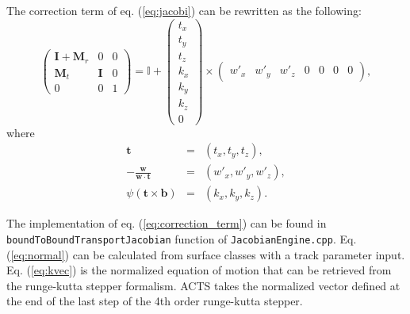 \documentclass[12pt,a4paper]{scrarticle}
\begin{document}
The correction term of eq. (\ref{eq:jacobi}) can be rewritten as the following:
\begin{equation}\label{eq:correction_term}
    \begin{pmatrix}
     \mathbf{I} + \mathbf{M}_r & 0 & 0 \\
     \mathbf{M}_t & \mathbf{I} & 0 \\
     0 & 0 & 1
    \end{pmatrix} = 
    \mathbb{I} +
    \begin{pmatrix}
     t_x \\
     t_y \\
     t_z \\
     k_x \\
     k_y \\
     k_z \\
     0
    \end{pmatrix} \times
    \begin{pmatrix}
       w'_x & w'_y & w'_z & 0 & 0 & 0 & 0
    \end{pmatrix},
\end{equation}
where 
\begin{eqnarray}
  \mathbf{t} & = & (t_x ,t_y, t_z),  \\
  - \frac{\mathbf{w}}{\mathbf{w} \cdot \mathbf{t}} & = & (w'_x ,w'_y, w'_z), \label{eq:normal}  \\
  \psi(\mathbf{t} \times \mathbf{b}) & = & (k_x, k_y, k_z). \label{eq:kvec}
\end{eqnarray}

The implementation of eq. (\ref{eq:correction_term}) can be found in \verb|boundToBoundTransportJacobian| function of \verb|JacobianEngine.cpp|. Eq. (\ref{eq:normal}) can be calculated from surface classes with a track parameter input. Eq. (\ref{eq:kvec}) is the normalized equation of motion that can be retrieved from the runge-kutta stepper formalism. ACTS takes the normalized vector defined at the end of the last step of the 4th order runge-kutta stepper.

\printbibliography{}
\end{document}
